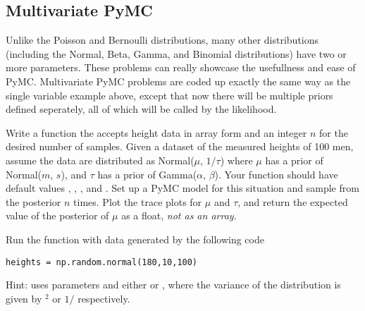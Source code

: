 \subsection*{Multivariate PyMC}
Unlike the Poisson and Bernoulli distributions, many other distributions (including the Normal, Beta, Gamma, and Binomial distributions) have two or more parameters.
These problems can really showcase the usefullness and ease of PyMC.
Multivariate PyMC problems are coded up exactly the same way as the single variable example above, except that now there will be multiple priors defined seperately, all of which will be called by the likelihood.

\begin{problem}
Write a function the accepts height data in array form and an integer $n$ for the desired number of samples.
Given a dataset of the measured heights of 100 men, assume the data are distributed as Normal($\mu$, $1/\tau$) where $\mu$ has a prior of Normal($m$, $s$), and $\tau$ has a prior of Gamma($\alpha$, $\beta$).
Your function should have default values , , , and .
Set up a PyMC model for this situation and sample from the posterior $n$ times.
Plot the trace plots for $\mu$ and $\tau$, and return the expected value of the posterior of $\mu$ as a float, \emph{not as an array}.

Run the function with data generated by the following code 
\begin{lstlisting}
heights = np.random.normal(180,10,100)
\end{lstlisting}
\noindent Hint:  uses parameters  and either  or , where the variance of the distribution is given by $^2$ or $1/$ respectively.
\end{problem} 
